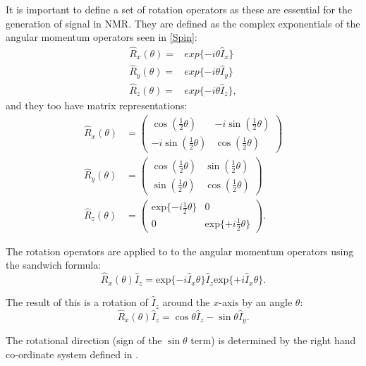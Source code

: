 It is important to define a set of rotation operators as these are essential for the generation of signal in NMR. They are defined as the complex exponentials of the
angular momentum operators seen in \ref{Spin}:
\begin{align}\label{eqn:RotOp}
  \hat{R}_x(\theta) =& exp\{-i\theta\hat{I}_x\}\\
  \hat{R}_y(\theta) =& exp\{-i\theta\hat{I}_y\}\\
  \hat{R}_z(\theta) =& exp\{-i\theta\hat{I}_z\},
\end{align}
 and they too have matrix representations:
 \begin{align}\label{eqn:RotMat}
   \hat{R}_x(\theta)& = \begin{pmatrix}
      \cos(\frac{1}{2}\theta) & -i\sin(\frac{1}{2}\theta)\\
      -i\sin(\frac{1}{2}\theta) & \cos(\frac{1}{2}\theta)
 \end{pmatrix}\\
 \hat{R}_y(\theta)& = \begin{pmatrix}
    \cos(\frac{1}{2}\theta) & \sin(\frac{1}{2}\theta)\\
    \sin(\frac{1}{2}\theta) & \cos(\frac{1}{2}\theta)
\end{pmatrix}\\
\hat{R}_z(\theta)& = \begin{pmatrix}
    \text{exp}\{-i\frac{1}{2}\theta\} & 0\\
    0 & \text{exp}\{+i\frac{1}{2}\theta\}
\end{pmatrix}.
 \end{align}

The rotation operators are applied to to the angular momentum operators using the sandwich formula:
\begin{equation}
  \hat{R}_x(\theta)\hat{I}_z = \text{exp}\{-i\hat{I}_x\theta\}\hat{I}_z\text{exp}\{+i\hat{I}_x\theta\}.
\end{equation}

The result of this is a rotation of $\hat{I}_z$ around the $x$-axis by an angle $\theta$:
\begin{equation}
  \hat{R}_x(\theta)\hat{I}_z = \cos{\theta}\hat{I}_z - \sin{\theta}\hat{I}_y.
\end{equation}

The rotational direction (sign of the $\sin{\theta}$ term) is determined by the right hand co-ordinate system defined in .


